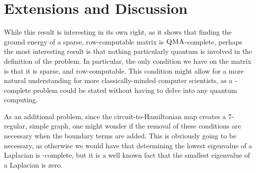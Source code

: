 \documentclass[../thesis-main/thesis-main]{subfiles}
\begin{document}
\section{Extensions and Discussion}

While this result is interesting in its own right, as it shows that finding the ground energy of a sparse, row-computable matrix is $\textsc{QMA}$-complete, perhaps the most interesting result is that nothing particularly quantum is involved in the definition of the problem.  In particular, the only condition we have on the matrix is that it is sparse, and row-computable.  This condition might allow for a more natural understanding for more classically-minded computer scientists, as a \QMA-complete problem could be stated without having to delve into any quantum computing.

As an additional problem, since the circuit-to-Hamiltonian map creates a 7-regular, simple graph, one might wonder if the removal of these conditions are necessary when the boundary terms are added.  This is obviously going to be necessary, as otherwise we would have that determining the lowest eigenvalue of a Laplacian is \QMA-complete, but it is a well known fact that the smallest eigenvalue of a Laplacian is zero.  

\end{document}
